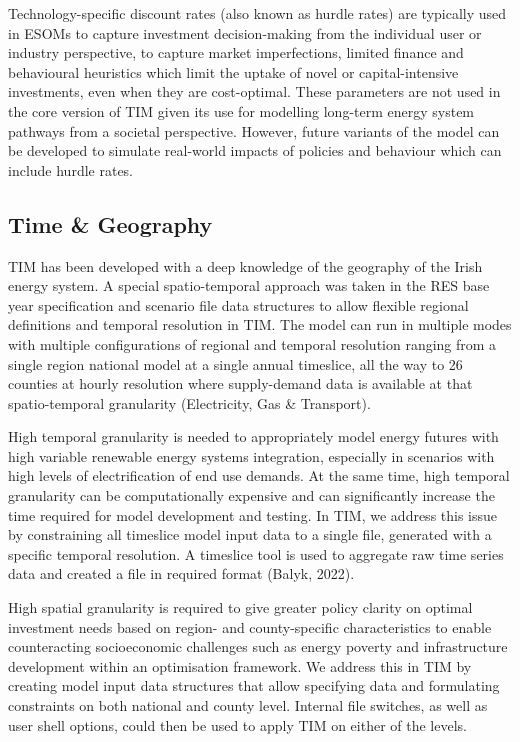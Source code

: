 \documentclass[gmd,manuscript]{copernicus}
\begin{document}
Technology-specific discount rates (also known as hurdle rates) are typically used in ESOMs to capture investment decision-making from the individual user or industry perspective, to capture market imperfections, limited finance and behavioural heuristics which limit the uptake of novel or capital-intensive investments, even when they are cost-optimal. These parameters are not used in the core version of TIM given its use for modelling long-term energy system pathways from a societal perspective. However, future variants of the model can be developed to simulate real-world impacts of policies and behaviour which can include hurdle rates. 

\subsection{Time \& Geography}
\label{ss:time_geo}
TIM has been developed with a deep knowledge of the geography of the Irish energy system. A special spatio-temporal approach was taken in the RES base year specification and scenario file data structures to allow flexible regional definitions and temporal resolution in TIM. The model can run in multiple modes with multiple configurations of regional and temporal resolution ranging from a single region national model at a single annual timeslice, all the way to 26 counties at hourly resolution where supply-demand data is available at that spatio-temporal granularity (Electricity, Gas \& Transport). 

High temporal granularity is needed to appropriately model energy futures with high variable renewable energy systems integration, especially in scenarios with high levels of electrification of end use demands. At the same time, high temporal granularity can be computationally expensive and can significantly increase the time required for model development and testing. In TIM, we address this issue by constraining all timeslice model input data to a single file, generated with a specific temporal resolution. A timeslice tool is used to aggregate raw time series data and created a file in required format (Balyk, 2022).

High spatial granularity is required to give greater policy clarity on optimal investment needs based on region- and county-specific characteristics to enable counteracting socioeconomic challenges such as energy poverty and infrastructure development within an optimisation framework. We address this in TIM by creating model input data structures that allow specifying data and formulating constraints on both national and county level. Internal file switches, as well as user shell options, could then be used to apply TIM on either of the levels. 
\end{document}
